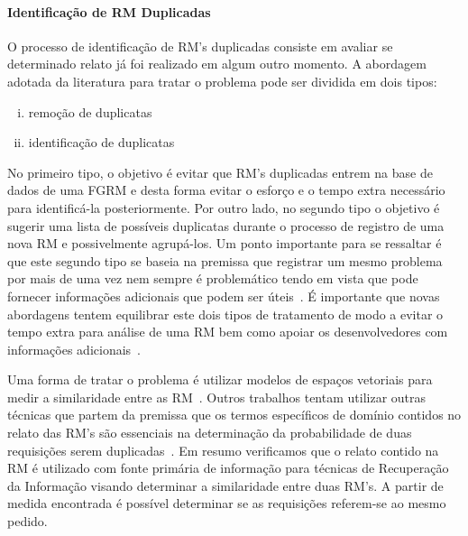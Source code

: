 
\paragraph{Identificação de RM Duplicadas} O processo de identificação de RM's
duplicadas consiste em avaliar se determinado relato já foi realizado em algum
outro momento. A abordagem adotada da literatura para tratar o problema pode ser
dividida em dois tipos\cite{kaushik2012comparative, tian2012improved}:

\begin{enumerate}[(i)]
	\item remoção de duplicatas
	\item identificação de duplicatas
\end{enumerate}

No primeiro tipo, o objetivo é evitar que RM's duplicadas entrem na base de
dados de uma FGRM e desta forma evitar o esforço e o tempo extra necessário para
identificá-la posteriormente. Por outro lado, no segundo tipo o objetivo é
sugerir uma lista de possíveis duplicatas durante o processo de registro de uma
nova RM e possivelmente agrupá-los. Um ponto importante para se ressaltar é que
este segundo tipo se baseia na premissa que registrar um mesmo problema por mais
de uma vez nem sempre é problemático tendo em vista que pode fornecer
informações adicionais que podem ser úteis~\cite{bettenburg2008duplicate}. É
importante que novas abordagens tentem equilibrar este dois tipos de tratamento
de modo a evitar o tempo extra para análise de uma RM bem como apoiar os
desenvolvedores com informações
adicionais~\cite{Lerch:2013:FDY:2495256.2495763,Thung2014}.

Uma forma de tratar o problema é utilizar modelos de espaços vetoriais para
medir a similaridade entre as RM~\cite{liu2014faceted, sun2010discriminative,
	Thung2014,tomavsev2013exploiting}. Outros trabalhos tentam utilizar outras
técnicas que partem da premissa que os termos específicos de domínio contidos no
relato das RM's são essenciais na determinação da probabilidade de duas
requisições serem duplicadas~\cite{hindle2016contextual, alipour2013contextual}.
Em resumo verificamos que o relato contido na RM é utilizado com fonte primária
de informação para técnicas de Recuperação da Informação visando determinar a
similaridade entre duas RM's. A partir de medida encontrada é possível
determinar se as requisições referem-se ao mesmo pedido.

